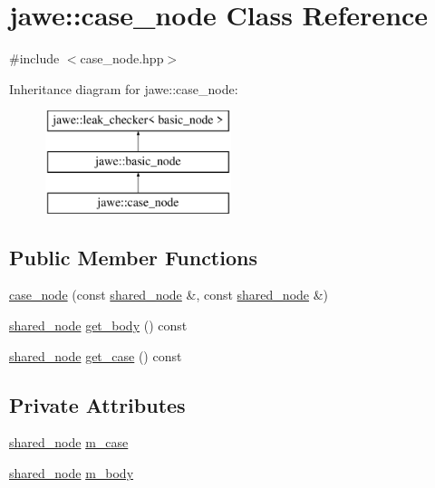 \hypertarget{classjawe_1_1case__node}{}\section{jawe\+:\+:case\+\_\+node Class Reference}
\label{classjawe_1_1case__node}


{\ttfamily \#include $<$case\+\_\+node.\+hpp$>$}

Inheritance diagram for jawe\+:\+:case\+\_\+node\+:\begin{figure}[H]
\begin{center}
\leavevmode
\includegraphics[height=3.000000cm]{classjawe_1_1case__node}
\end{center}
\end{figure}
\subsection*{Public Member Functions}
\begin{DoxyCompactItemize}
\item 
\hyperlink{classjawe_1_1case__node_a99b22c0a8ef6b596439a876510ee790a}{case\+\_\+node} (const \hyperlink{namespacejawe_a3f307481d921b6cbb50cc8511fc2b544}{shared\+\_\+node} \&, const \hyperlink{namespacejawe_a3f307481d921b6cbb50cc8511fc2b544}{shared\+\_\+node} \&)
\item 
\hyperlink{namespacejawe_a3f307481d921b6cbb50cc8511fc2b544}{shared\+\_\+node} \hyperlink{classjawe_1_1case__node_a04a49f28923cf8ea3faee431bd6797e7}{get\+\_\+body} () const
\item 
\hyperlink{namespacejawe_a3f307481d921b6cbb50cc8511fc2b544}{shared\+\_\+node} \hyperlink{classjawe_1_1case__node_a005b7e103d6dec24adf567f7be67d363}{get\+\_\+case} () const
\end{DoxyCompactItemize}
\subsection*{Private Attributes}
\begin{DoxyCompactItemize}
\item 
\hyperlink{namespacejawe_a3f307481d921b6cbb50cc8511fc2b544}{shared\+\_\+node} \hyperlink{classjawe_1_1case__node_a8d02757ea9e3677d4ff6be8fc01112b6}{m\+\_\+case}
\item 
\hyperlink{namespacejawe_a3f307481d921b6cbb50cc8511fc2b544}{shared\+\_\+node} \hyperlink{classjawe_1_1case__node_a50358640675afacd6a8a11d9c4edbb23}{m\+\_\+body}
\end{DoxyCompactItemize}

